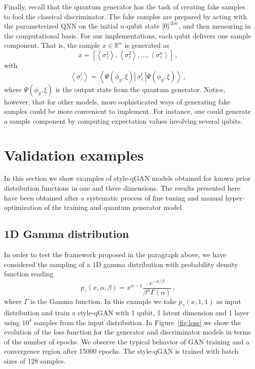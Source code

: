 \documentclass[twocolumn,preprintnumbers,superscriptaddress]{revtex4-2}
\begin{document}
Finally, recall that the quantum generator has the task of creating fake samples to fool the classical discriminator. The fake samples are prepared by acting with the parameterized QNN on the initial $n$-qubit state $\ket{0}^{\otimes n}$, and then measuring in the computational basis. For our implementations, each qubit delivers one sample component. That is, the sample $x \in \mathbb{R}^n$ is generated as
\begin{equation}
    \label{eq:samples} x = \left[\left\langle\sigma_z^1\right\rangle,\left\langle\sigma_z^2\right\rangle,\hdots,\left\langle\sigma_z^n\right\rangle\right]\,,
\end{equation}
with 
\begin{equation}
    \label{eq:expectation}\left\langle\sigma_z^i\right\rangle = \left\langle\Psi(\phi_g,\xi)\left|\,\sigma_z^i\,\right|\Psi(\phi_g,\xi)\right\rangle \,,
\end{equation}
where $\Psi(\phi_g,\xi)$ is the output state from the quantum generator. Notice, however, that for other models, more sophisticated ways of generating fake samples could be more convenient to implement. For instance, one could generate a sample component by computing expectation values involving several qubits.

\section{Validation examples}
\label{sec:validation}

In this section we show examples of style-qGAN models obtained for known prior
distribution functions in one and three dimensions. The results presented here
have been obtained after a systematic process of fine tuning and manual
hyper-optimization of the training and quantum generator model.

\subsection{1D Gamma distribution}
\label{sec:gamma}

In order to test the framework proposed in the paragraph above, we have
considered the sampling of a 1D gamma distribution with probability density
function reading
\begin{equation}
  p_\gamma (x, \alpha, \beta) = x^{\alpha-1} \frac{e^{-x/\beta}}{\beta^\alpha \Gamma(\alpha)}\,,
\end{equation}
where $\Gamma$ is the Gamma function. In this example we take $p_\gamma (x, 1,
1)$ as input distribution and train a style-qGAN with 1 qubit, 1 latent dimension and
1 layer using $10^4$ samples from the input distribution.
%
In Figure~\ref{fig:loss} we show the evolution of the loss function for the
generator and discriminator models in terms of the number of epochs. We observe the
typical behavior of GAN training and a convergence region after 15000 epochs.
%
The style-qGAN is trained with batch sizes of 128 samples.
\end{document}
